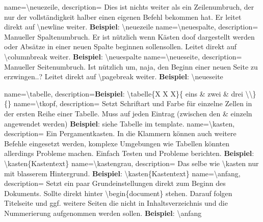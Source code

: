{
    name={\textbackslash neuezeile},
    description={
            Dies ist nichts weiter als ein Zeilenumbruch, der nur der vollständigkeit halber einen eigenen Befehl bekommen hat. Er leitet direkt auf \textbackslash newline weiter. \newline
            \textbf{Beispiel}: \textbackslash neuezeile
        }
}
{
    name={\textbackslash neuespalte},
    description={
            Manueller Spaltenumbruch. Er ist nützlich wenn Kästen doof dargestellt werden oder Absätze in einer neuen Spalte beginnen sollensollen. Leitet direkt auf \textbackslash columnbreak weiter. \newline
            \textbf{Beispiel}: \textbackslash neuespalte
        }
}
{
    name={\textbackslash neueseite},
    description={
            Manueller Seitenumbruch. Ist nützlich um, naja, den Beginn einer neuen Seite zu erzwingen..? Leitet direkt auf \textbackslash pagebreak weiter. \newline
            \textbf{Beispiel}: \textbackslash neueseite
        }
}

{
    name={\textbackslash tabelle},
    description={\textbf{Beispiel}: \textbackslash tabelle\{X X X\}\{ eins \& zwei \& drei \textbackslash \textbackslash \}\{\}\newline
        }
}
{
    name={\textbackslash tkopf},
    description={
            Setzt Schriftart und Farbe für einzelne Zellen in der ersten Reihe einer Tabelle. Muss auf jeden Eintrag (zwischen den \& einzeln angewendet werden)\newline
            \textbf{Beispiel}: siehe Tabelle im template.
        }
}
{
    name={\textbackslash kasten},
    description={
            Ein Pergamentkasten. In die Klammern können auch weitere Befehle eingesetzt werden, komplexe Umgebungen wie Tabellen könnten allerdings Probleme machen. Einfach Testen und Probleme berichten.\newline
            \textbf{Beispiel}: \textbackslash kasten\{Kastentext\}
        }
}
{
    name={\textbackslash kastengrau},
    description={
            Das selbe wie \textbackslash kasten nur mit blasserem Hintergrund.
            \newline
            \textbf{Beispiel}: \textbackslash kasten\{Kastentext\}
        }
}
{
    name={\textbackslash anfang},
    description={
            Setzt ein paar Grundeinstellungen direkt zum Beginn des Dokuments. Sollte direkt hinter \textbackslash begin\{document\} stehen. Darauf folgen Titelseite und ggf. weitere Seiten die nicht in Inhaltsverzeichnis und die Nummerierung aufgenommen werden sollen.
            \textbf{Beispiel}: \textbackslash anfang
        }
}

